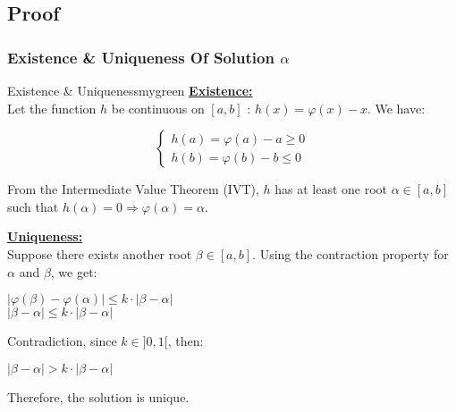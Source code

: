 \vspace{0.5cm}

\subsection{Proof}
\subsubsection{Existence \& Uniqueness Of Solution \(\alpha\)}
\begin{prettyBox}{Existence \& Uniqueness}{mygreen}
\textbf{\underline{Existence:}}\\[0.2cm]
Let the function \(h\) be continuous on \([a,b]\) : \(h(x) = \varphi(x) - x\).
We have:

\vspace{-0.6cm}
\begin{center}
\[
\left\{
\begin{array}{ll}
   h(a) = \varphi(a) - a \geq 0 \\[0.1cm]
   h(b) = \varphi(b) - b \leq 0
\end{array}
\right.
\]
\end{center}

From the Intermediate Value Theorem (IVT), \(h\) has at least one root \(\alpha \in [a,b]\) such that  
\(h(\alpha) = 0 \Longrightarrow \varphi(\alpha) = \alpha\).

\vspace{0.4cm}

\textbf{\underline{Uniqueness:}}\\[0.2cm]
Suppose there exists another root \(\beta \in [a,b]\). Using the contraction property for
\(\alpha\) and \(\beta\), we get:
\vspace{0.1cm}
\begin{center}
    \(|\varphi(\beta) - \varphi(\alpha)| \leq k\cdot|\beta-\alpha|\)\\[0.2cm]
    \(|\beta - \alpha| \leq k\cdot|\beta-\alpha|\)
\end{center}
Contradiction, since \(k \in ]0,1[\), then:
\begin{center}
      \(|\beta - \alpha| > k\cdot|\beta-\alpha|\)\\[0.1cm]
\end{center}
Therefore, the solution is unique.
\end{prettyBox}

\vspace{0.5cm}


